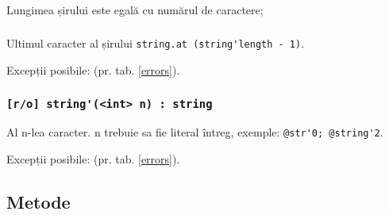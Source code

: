 \subsubsection{}

Lungimea șirului este egală cu numărul de caractere;

\subsubsection{}

Ultimul caracter al șirului \lstinline|string.at (string'length - 1)|.

Excepții posibile:  (pr. tab. \ref{errors}).

\subsubsection{\lstinline|[r/o] string'(<int> n) : string|}

Al n-lea caracter. n trebuie sa fie literal întreg, exemple: \lstinline|@str'0; @string'2|.

Excepții posibile:  (pr. tab. \ref{errors}).

\subsection{Metode}

